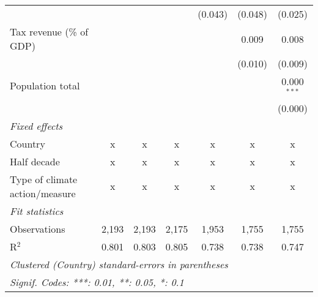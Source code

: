 \begin{tabular}{lcccccc}
                                                &              &              &               & (0.043)       & (0.048)       & (0.025)\\   
   Tax revenue (\% of GDP)                      &              &              &               &               & 0.009         & 0.008\\   
                                                &              &              &               &               & (0.010)       & (0.009)\\   
   Population total                             &              &              &               &               &               & 0.000$^{***}$\\   
                                                &              &              &               &               &               & (0.000)\\   
   \emph{Fixed effects}\\
   Country                                      & x            & x            & x             & x             & x             & x\\  
   Half decade                                  & x            & x            & x             & x             & x             & x\\  
   Type of climate action/measure               & x            & x            & x             & x             & x             & x\\  
   \midrule \emph{Fit statistics}\\
   Observations                                 & 2,193        & 2,193        & 2,175         & 1,953         & 1,755         & 1,755\\  
   R$^2$                                        & 0.801        & 0.803        & 0.805         & 0.738         & 0.738         & 0.747\\  
   \midrule
   \multicolumn{7}{l}{\emph{Clustered (Country) standard-errors in parentheses}}\\
   \multicolumn{7}{l}{\emph{Signif. Codes: ***: 0.01, **: 0.05, *: 0.1}}\\
\end{tabular}
\par\endgroup


